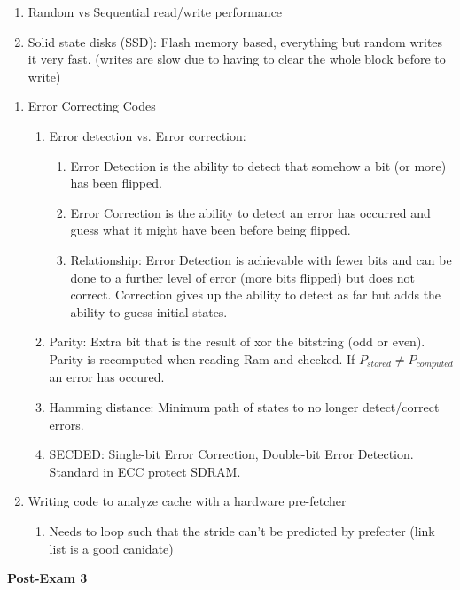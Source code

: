 \documentclass[12pt]{article}
\renewcommand{\=}[1]{\stackrel{#1}{=}} %
\theoremstyle{definition}
\theoremstyle{remark}
\begin{document}
\begin{enumerate}
\begin{enumerate}
    \item Random vs Sequential read/write performance
    \item Solid state disks (SSD): Flash memory based, everything but
      random writes it very fast. (writes are slow due to having to
      clear the whole block before to write)
    \end{enumerate}
    \begin{enumerate}
    \item Error Correcting Codes
      \begin{enumerate}
      \item Error detection vs. Error correction:
        \begin{enumerate}
        \item Error Detection is the ability to detect that somehow a
          bit (or more) has been flipped.
        \item Error Correction is the ability to detect an error has
          occurred and guess what it might have been before being flipped.
        \item Relationship: Error Detection is achievable with fewer
          bits and can be done to a further level of error (more bits
          flipped) but does not correct. Correction gives up the
          ability to detect as far but adds the ability to guess
          initial states.
        \end{enumerate}
      \item Parity: Extra bit that is the result of xor the bitstring
        (odd or even). Parity is recomputed when reading Ram and
        checked. If $P_{stored} \neq P_{computed}$ an error has occured.
      \item Hamming distance: Minimum path of states to no longer
        detect/correct errors.
      \item SECDED: Single-bit Error Correction, Double-bit Error
        Detection. Standard in ECC protect SDRAM.
      \end{enumerate}
    \item Writing code to analyze cache with a hardware pre-fetcher
      \begin{enumerate}
      \item Needs to loop such that the stride can't be predicted by
        prefecter (link list is a good canidate)
      \end{enumerate}
    \end{enumerate}
  \end{enumerate}
  \textbf{Post-Exam 3}
\end{document}
